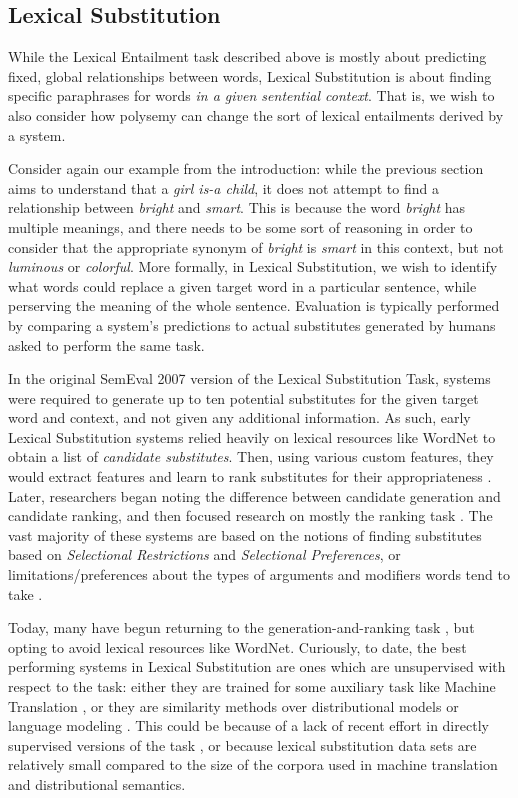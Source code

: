 \documentclass[letterpaper]{article}
\begin{document}
\subsection{Lexical Substitution}

While the Lexical Entailment task described above is mostly about predicting
fixed, global relationships between words, Lexical Substitution is about
finding specific paraphrases for words {\em in a given sentential context}.
That is, we wish to also consider how polysemy can change the sort of
lexical entailments derived by a system.

Consider again our example from the introduction: while the previous section
aims to understand that a {\em girl is-a child}, it does not attempt to find a
relationship between {\em bright} and {\em smart}. This is because the word
{\em bright} has multiple meanings, and there needs to be some sort of
reasoning in order to consider that the appropriate synonym of {\em bright}
is {\em smart} in this context, but not {\em luminous} or {\em colorful}.
More formally, in Lexical Substitution, we wish to identify what
words could replace a given target word in a particular sentence, while
perserving the meaning of the whole sentence. Evaluation is typically
performed by comparing a system's predictions to actual substitutes generated
by humans asked to perform the same task.

In the original SemEval 2007 version of the Lexical Substitution Task, systems
were required to generate up to ten potential substitutes for the given target
word and context, and not given any additional information. As such, early
Lexical Substitution systems relied heavily on lexical resources like WordNet
to obtain a list of {\em candidate substitutes}. Then, using various custom
features, they would extract features and learn to rank substitutes for their
appropriateness \cite{mccarthy:2007:semeval}. Later, researchers began noting
the difference between candidate generation and candidate ranking, and then
focused research on mostly the ranking task \cite{NEEDCITE}. The vast majority
of these systems are based on the notions of finding substitutes based on {\em
Selectional Restrictions} and {\em Selectional Preferences}, or
limitations/preferences about the types of arguments and modifiers words tend
to take \cite{NEEDCITE}.

Today, many have begun returning to the generation-and-ranking task
\cite{kawakami:2015:arxiv,melamud:2015:naacl,roller:2016:naacl}, but opting to
avoid lexical resources like WordNet.  Curiously, to date, the best performing
systems in Lexical Substitution are ones which are unsupervised with respect to
the task: either they are trained for some auxiliary task like Machine
Translation \cite{kawakami:2015:arxiv}, or they are similarity methods over
distributional models \cite{roller:2016:naacl} or language modeling
\cite{melamud:2015:naacl}. This could be because of a lack of recent effort in
directly supervised versions of the task \cite{szarvas:2013:naacl}, or because
lexical substitution data sets are relatively small compared to the size of the
corpora used in machine translation and distributional semantics.
\end{document}
